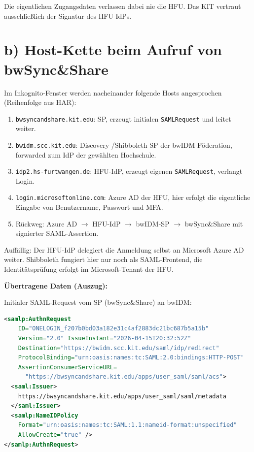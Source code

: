 \documentclass[
	fontsize=12pt,
	paper=a4,
	numbers=noenddot,
	listof=totoc,
	listof=entryprefix,
	listof=nochaptergap,
	bibliography=totoc,
	parskip=half,
	openany
]{scrbook}
\begin{document}
Die eigentlichen Zugangsdaten verlassen dabei nie die HFU.
Das KIT vertraut ausschließlich der Signatur des HFU-IdPs.

\section*{b) Host-Kette beim Aufruf von bwSync\&Share}

Im Inkognito-Fenster werden nacheinander folgende Hosts angesprochen (Reihenfolge aus HAR):

\begin{enumerate}
	\item \texttt{bwsyncandshare.kit.edu}: SP, erzeugt initialen \texttt{SAMLRequest} und leitet weiter.
	\item \texttt{bwidm.scc.kit.edu}: Discovery-/Shibboleth-SP der bwIDM-Föderation, forwarded zum IdP der gewählten Hochschule.
	\item \texttt{idp2.hs-furtwangen.de}: HFU-IdP, erzeugt eigenen \texttt{SAMLRequest}, verlangt Login.
	\item \texttt{login.microsoftonline.com}: Azure AD der HFU, hier erfolgt die eigentliche Eingabe von Benutzername, Passwort und MFA.
	\item Rückweg: Azure AD $\to$ HFU-IdP $\to$ bwIDM-SP $\to$ bwSync\&Share mit signierter SAML-Assertion.
\end{enumerate}

Auffällig: Der HFU-IdP delegiert die Anmeldung selbst an Microsoft Azure AD weiter.
Shibboleth fungiert hier nur noch als SAML-Frontend, die Identitätsprüfung erfolgt im Microsoft-Tenant der HFU.

\textbf{Übertragene Daten (Auszug):}

Initialer SAML-Request vom SP (bwSync\&Share) an bwIDM:

\begin{lstlisting}[language=XML]
<samlp:AuthnRequest
    ID="ONELOGIN_f207b0bd03a182e31c4af2883dc21bc687b5a15b"
    Version="2.0" IssueInstant="2026-04-15T20:32:52Z"
    Destination="https://bwidm.scc.kit.edu/saml/idp/redirect"
    ProtocolBinding="urn:oasis:names:tc:SAML:2.0:bindings:HTTP-POST"
    AssertionConsumerServiceURL=
      "https://bwsyncandshare.kit.edu/apps/user_saml/saml/acs">
  <saml:Issuer>
    https://bwsyncandshare.kit.edu/apps/user_saml/saml/metadata
  </saml:Issuer>
  <samlp:NameIDPolicy
    Format="urn:oasis:names:tc:SAML:1.1:nameid-format:unspecified"
    AllowCreate="true" />
</samlp:AuthnRequest>
\end{lstlisting}
\end{document}
